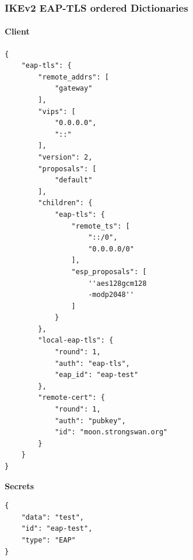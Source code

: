 \subsubsection{IKEv2 EAP-TLS ordered Dictionaries}
\noindent\begin{minipage}[t]{0.5\textwidth}
\vspace{0pt}
\paragraph{Client}\mbox{}\medskip
\begin{lstlisting}[style=BashInputStyle]
{
    "eap-tls": {
        "remote_addrs": [
            "gateway"
        ],
        "vips": [
            "0.0.0.0",
            "::"
        ],
        "version": 2,
        "proposals": [
            "default"
        ],
        "children": {
            "eap-tls": {
                "remote_ts": [
                    "::/0",
                    "0.0.0.0/0"
                ],
                "esp_proposals": [
                    ''aes128gcm128
                    -modp2048''
                ]
            }
        },
        "local-eap-tls": {
            "round": 1,
            "auth": "eap-tls",
            "eap_id": "eap-test"
        },
        "remote-cert": {
            "round": 1,
            "auth": "pubkey",
            "id": "moon.strongswan.org"
        }
    }
}
\end{lstlisting}
\hspace*{18pt}\textbf{Secrets}\mbox{}\medskip
\begin{lstlisting}[style=BashInputStyle]
{
    "data": "test",
    "id": "eap-test",
    "type": "EAP"
}
\end{lstlisting}
\end{minipage}
\hfill
